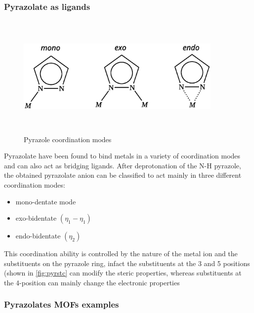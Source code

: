 \documentclass[../Master.tex]{subfiles}
\begin{document}
\subsubsection{Pyrazolate as ligands}
\begin{figure}[h]
	\centering
	\includegraphics[width=10cm,height=6cm,keepaspectratio]{Structures/pyrazolecordmode.eps}
	\caption{Pyrazole coordination modes}
	\label{fig:pyrazole-cord-mode}
\end{figure}
Pyrazolate have been found to bind metals in a variety of coordination modes and can also act as bridging ligands.
After deprotonation of the N-H pyrazole, the obtained pyrazolate anion can be classified to act mainly in three different coordination modes:
\begin{itemize}
	\item  mono-dentate mode
	\item exo-bidentate \((\eta_{1}-\eta_{1})\)
	\item endo-bidentate \((\eta_{2})\)
\end{itemize}
This coordination ability is controlled by the nature of the metal ion and the substituents on the pyrazole ring, infact the substituents at the 3 and 5 positions (shown in \ref{fig:pyrstc} can modify the steric properties, whereas substituents at the 4-position can mainly change the electronic properties

\subsubsection{Pyrazolates MOFs examples}



\end{document}
